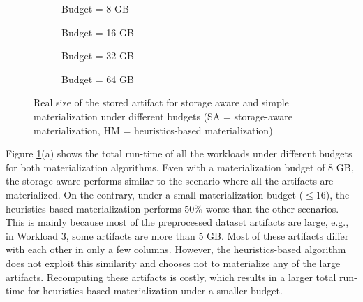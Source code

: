 \begin{figure}
\begin{subfigure}[b]{0.5\linewidth}
\centering
 \resizebox{\columnwidth}{!}{%
%
}
\caption{Budget = 8 GB}
\end{subfigure}%
\begin{subfigure}[b]{0.5\linewidth}
\centering
 \resizebox{\columnwidth}{!}{%
%
}

\caption{Budget = 16 GB}
\end{subfigure}
\begin{subfigure}[b]{0.5\linewidth}
\centering
 \resizebox{\columnwidth}{!}{%
%
}

\caption{Budget = 32 GB}
\end{subfigure}%
\begin{subfigure}[b]{0.5\linewidth}
\centering
 \resizebox{\columnwidth}{!}{%
%
}
\caption{Budget = 64 GB}
\end{subfigure}
\caption{Real size of the stored artifact for storage aware and simple materialization under different budgets (SA = storage-aware materialization, HM = heuristics-based materialization)  }
\label{exp-sa-vs-simple-size}
\end{figure}

Figure \ref{exp-sa-vs-simple-size}(a) shows the total run-time of all the workloads under different budgets for both materialization algorithms.
Even with a materialization budget of 8 GB, the storage-aware performs similar to the scenario where all the artifacts are materialized.
On the contrary, under a small materialization budget ($\leq 16$), the heuristics-based materialization performs 50\% worse than the other scenarios.
This is mainly because most of the preprocessed dataset artifacts are large, e.g., in Workload 3, some artifacts are more than 5 GB.
Most of these artifacts differ with each other in only a few columns.
However, the heuristics-based algorithm does not exploit this similarity and chooses not to materialize any of the large artifacts.
Recomputing these artifacts is costly, which results in a larger total run-time for heuristics-based materialization under a smaller budget.

